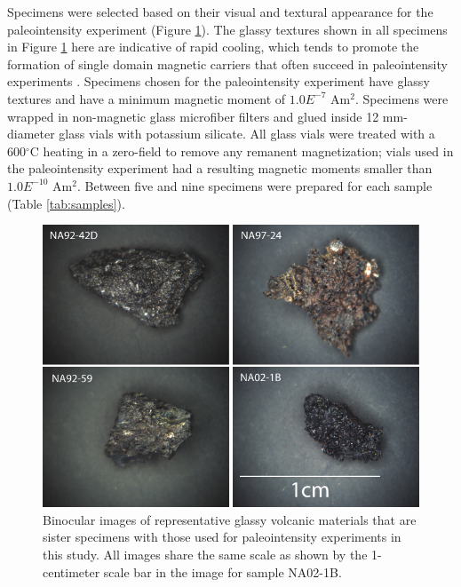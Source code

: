 \documentclass[draft]{agujournal2019}
\begin{document}
Specimens were selected based on their visual and textural appearance for the paleointensity experiment (Figure \ref{Binocular_image}). The glassy textures shown in all specimens in Figure \ref{Binocular_image} here are indicative of rapid cooling, which tends to  %
promote the formation of single domain magnetic carriers that often succeed in paleointensity experiments \cite{Tauxe2004a}. Specimens chosen for the paleointensity experiment have glassy textures and have a minimum magnetic moment of $1.0E^{-7}$ Am$^{2}$. Specimens were wrapped in non-magnetic glass microfiber filters and glued inside 12 mm-diameter glass vials with potassium silicate. All glass vials were treated with a 600$^{\circ}$C heating in a zero-field to remove any remanent magnetization; vials used in the paleointensity experiment had a resulting magnetic moments smaller than $1.0E^{-10}$ Am$^{2}$. Between five and nine specimens were prepared for each sample (Table \ref{tab:samples}). 

\begin{figure}
\noindent\includegraphics[width=35pc]{../Figure/Aniakchak_bino.pdf}
\caption{Binocular images of representative glassy volcanic materials that are sister specimens with those used for paleointensity experiments in this study. All images share the same scale as shown by the 1-centimeter scale bar in the image for sample NA02-1B. }
\label{Binocular_image}
\end{figure}
\end{document}
